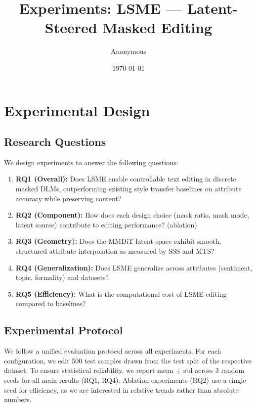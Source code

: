 \documentclass{article}
\title{Experiments: LSME --- Latent-Steered Masked Editing}
\author{Anonymous}
\date{\today}
\begin{document}
\maketitle

\section{Experimental Design}

\subsection{Research Questions}

We design experiments to answer the following questions:

\begin{enumerate}
  \item \textbf{RQ1 (Overall):} Does LSME enable controllable text editing in discrete masked DLMs, outperforming existing style transfer baselines on attribute accuracy while preserving content?
  \item \textbf{RQ2 (Component):} How does each design choice (mask ratio, mask mode, latent source) contribute to editing performance? (ablation)
  \item \textbf{RQ3 (Geometry):} Does the MMDiT latent space exhibit smooth, structured attribute interpolation as measured by SSS and MTS?
  \item \textbf{RQ4 (Generalization):} Does LSME generalize across attributes (sentiment, topic, formality) and datasets?
  \item \textbf{RQ5 (Efficiency):} What is the computational cost of LSME editing compared to baselines?
\end{enumerate}

\subsection{Experimental Protocol}

We follow a unified evaluation protocol across all experiments. For each configuration, we edit 500 test samples drawn from the test split of the respective dataset. To ensure statistical reliability, we report mean $\pm$ std across 3 random seeds for all main results (RQ1, RQ4). Ablation experiments (RQ2) use a single seed for efficiency, as we are interested in relative trends rather than absolute numbers.
\end{document}
